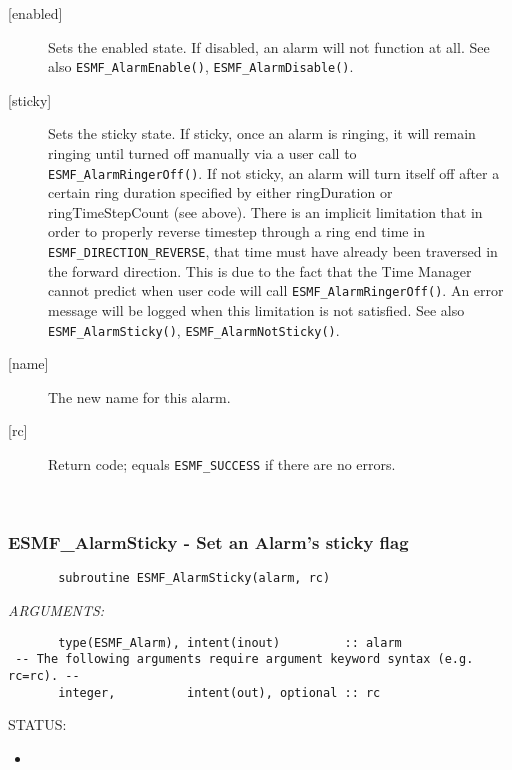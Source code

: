 \begin{description}
       \item[{[enabled]}]
            Sets the enabled state.  If disabled, an alarm will not function
            at all.
            See also {\tt ESMF\_AlarmEnable()}, {\tt ESMF\_AlarmDisable()}.
       \item[{[sticky]}]
            Sets the sticky state.  If sticky, once an alarm is ringing, it
            will remain ringing until turned off manually via a user call to
            {\tt ESMF\_AlarmRingerOff()}.  If not sticky, an alarm will turn
            itself off after a certain ring duration specified by either
            ringDuration or ringTimeStepCount (see above).
            There is an implicit limitation that in order to properly reverse
            timestep through a ring end time in {\tt ESMF\_DIRECTION\_REVERSE},
            that time must have already been traversed in the forward direction.
            This is due to the fact that the Time Manager cannot predict when
            user code will call {\tt ESMF\_AlarmRingerOff()}.  An error message
            will be logged when this limitation is not satisfied.
            See also {\tt ESMF\_AlarmSticky()}, {\tt ESMF\_AlarmNotSticky()}.
       \item[{[name]}]
            The new name for this alarm.
       \item[{[rc]}]
            Return code; equals {\tt ESMF\_SUCCESS} if there are no errors.
       \end{description}
   
 
\mbox{}\hrulefill\ 
 
\subsubsection [ESMF\_AlarmSticky] {ESMF\_AlarmSticky - Set an Alarm's sticky flag}


 
 
\begin{verbatim}       subroutine ESMF_AlarmSticky(alarm, rc)
 \end{verbatim}{\em ARGUMENTS:}
\begin{verbatim}       type(ESMF_Alarm), intent(inout)         :: alarm
 -- The following arguments require argument keyword syntax (e.g. rc=rc). --
       integer,          intent(out), optional :: rc
 \end{verbatim}
{\sf STATUS:}
   \begin{itemize}
   \item{}
   \end{itemize}
  
